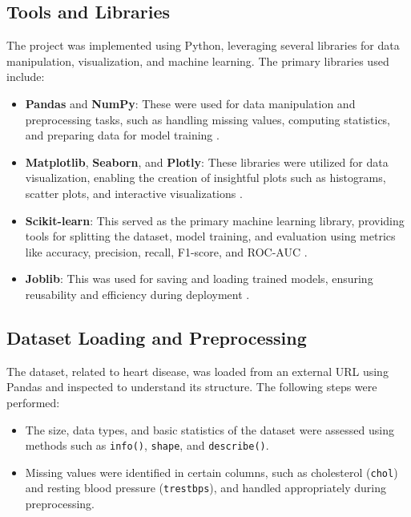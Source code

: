 \documentclass[pdflatex,sn-nature,Numbered]{sn-jnl}%
\theoremstyle{thmstyleone}%
\theoremstyle{thmstyletwo}%
\theoremstyle{thmstylethree}%
\begin{document}
\subsection{Tools and Libraries}
The project was implemented using Python, leveraging several libraries for data manipulation, visualization, and machine learning. The primary libraries used include:
\begin{itemize}
    \item \textbf{Pandas} and \textbf{NumPy}: These were used for data manipulation and preprocessing tasks, such as handling missing values, computing statistics, and preparing data for model training \cite{pandas2020gettingstarted, numpy2020gettingstarted}.
    \item \textbf{Matplotlib}, \textbf{Seaborn}, and \textbf{Plotly}: These libraries were utilized for data visualization, enabling the creation of insightful plots such as histograms, scatter plots, and interactive visualizations \cite{hunter2007matplotlib, seaborn2020gettingstarted, plotly2020gettingstarted}.
    \item \textbf{Scikit-learn}: This served as the primary machine learning library, providing tools for splitting the dataset, model training, and evaluation using metrics like accuracy, precision, recall, F1-score, and ROC-AUC \cite{pedregosa2011scikit}.
    \item \textbf{Joblib}: This was used for saving and loading trained models, ensuring reusability and efficiency during deployment \cite{joblib2020documentation}.
\end{itemize}

\subsection{Dataset Loading and Preprocessing}
The dataset, related to heart disease, was loaded from an external URL using Pandas and inspected to understand its structure. The following steps were performed:
\begin{itemize}
    \item The size, data types, and basic statistics of the dataset were assessed using methods such as \texttt{info()}, \texttt{shape}, and \texttt{describe()}.
    \item Missing values were identified in certain columns, such as cholesterol (\texttt{chol}) and resting blood pressure (\texttt{trestbps}), and handled appropriately during preprocessing.
\end{itemize}
\end{document}

